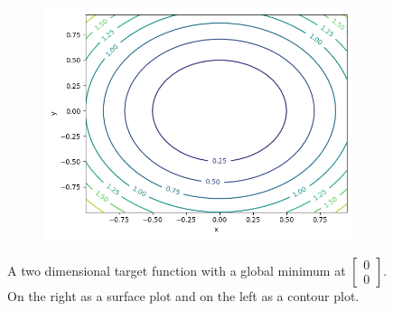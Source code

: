 \begin{figure}[ht!]
    \centering
    \begin{subfigure}{0.48\textwidth}
    \end{subfigure}
    \begin{subfigure}{0.48\textwidth}
        \includegraphics[width=\textwidth]{gfx/Figures/Theory/OptimizationTargetFunctionContour.png}
    \end{subfigure}
    \caption[.]{A two dimensional target function with a global minimum at \ensuremath{\begin{bmatrix} 0\\0 \end{bmatrix}}. On the right as a surface plot and on the left as a contour plot.}
    \label{fig:theory:target-function}
\end{figure}

